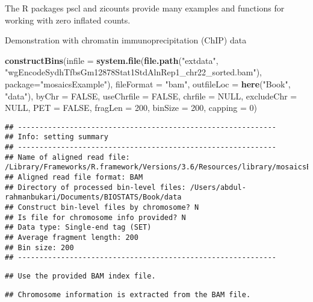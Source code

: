 \documentclass[]{article}
\newenvironment{Shaded}{\begin{snugshade}}{\end{snugshade}}
\newcommand{\DataTypeTok}[1]{\textcolor[rgb]{0.13,0.29,0.53}{#1}}
\newcommand{\DecValTok}[1]{\textcolor[rgb]{0.00,0.00,0.81}{#1}}
\newcommand{\KeywordTok}[1]{\textcolor[rgb]{0.13,0.29,0.53}{\textbf{#1}}}
\newcommand{\NormalTok}[1]{#1}
\newcommand{\OtherTok}[1]{\textcolor[rgb]{0.56,0.35,0.01}{#1}}
\newcommand{\StringTok}[1]{\textcolor[rgb]{0.31,0.60,0.02}{#1}}
\begin{document}
The R packages pscl and zicounts provide many examples and functions for
working with zero inflated counts.

Demonstration with chromatin immunoprecipitation (ChIP) data

\begin{Shaded}
\begin{Highlighting}[]
\KeywordTok{constructBins}\NormalTok{(}\DataTypeTok{infile =} \KeywordTok{system.file}\NormalTok{(}\KeywordTok{file.path}\NormalTok{(}\StringTok{"extdata"}\NormalTok{, }\StringTok{"wgEncodeSydhTfbsGm12878Stat1StdAlnRep1_chr22_sorted.bam"}\NormalTok{), }\DataTypeTok{package=}\StringTok{"mosaicsExample"}\NormalTok{),}
    \DataTypeTok{fileFormat =} \StringTok{"bam"}\NormalTok{, }\DataTypeTok{outfileLoc =} \KeywordTok{here}\NormalTok{(}\StringTok{"Book"}\NormalTok{, }\StringTok{"data"}\NormalTok{),}
    \DataTypeTok{byChr =} \OtherTok{FALSE}\NormalTok{, }\DataTypeTok{useChrfile =} \OtherTok{FALSE}\NormalTok{, }\DataTypeTok{chrfile =} \OtherTok{NULL}\NormalTok{, }\DataTypeTok{excludeChr =} \OtherTok{NULL}\NormalTok{,}
    \DataTypeTok{PET =} \OtherTok{FALSE}\NormalTok{, }\DataTypeTok{fragLen =} \DecValTok{200}\NormalTok{, }\DataTypeTok{binSize =} \DecValTok{200}\NormalTok{, }\DataTypeTok{capping =} \DecValTok{0}\NormalTok{)}
\end{Highlighting}
\end{Shaded}

\begin{verbatim}
## ------------------------------------------------------------
## Info: setting summary
## ------------------------------------------------------------
## Name of aligned read file: /Library/Frameworks/R.framework/Versions/3.6/Resources/library/mosaicsExample/extdata/wgEncodeSydhTfbsGm12878Stat1StdAlnRep1_chr22_sorted.bam 
## Aligned read file format: BAM 
## Directory of processed bin-level files: /Users/abdul-rahmanbukari/Documents/BIOSTATS/Book/data 
## Construct bin-level files by chromosome? N 
## Is file for chromosome info provided? N 
## Data type: Single-end tag (SET)
## Average fragment length: 200 
## Bin size: 200 
## ------------------------------------------------------------
\end{verbatim}

\begin{verbatim}
## Use the provided BAM index file.
\end{verbatim}

\begin{verbatim}
## Chromosome information is extracted from the BAM file.
\end{verbatim}
\end{document}
